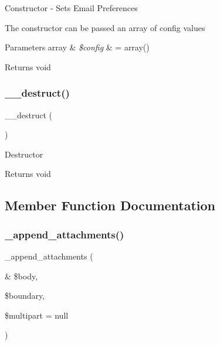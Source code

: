 Constructor -\/ Sets Email Preferences

The constructor can be passed an array of config values


\begin{DoxyParams}[1]{Parameters}
array & {\em \$config} & = array() \\
\hline
\end{DoxyParams}
\begin{DoxyReturn}{Returns}
void 
\end{DoxyReturn}
\mbox{\label{class_c_i___email_a421831a265621325e1fdd19aace0c758}} 
\subsubsection{\texorpdfstring{\+\_\+\+\_\+destruct()}{\_\_destruct()}}
{\footnotesize\ttfamily \+\_\+\+\_\+destruct (\begin{DoxyParamCaption}{ }\end{DoxyParamCaption})}

Destructor

\begin{DoxyReturn}{Returns}
void 
\end{DoxyReturn}


\subsection{Member Function Documentation}
\mbox{\label{class_c_i___email_a24b79594abe7528b9207c3dad7494f70}} 
\subsubsection{\texorpdfstring{\+\_\+append\+\_\+attachments()}{\_append\_attachments()}}
{\footnotesize\ttfamily \+\_\+append\+\_\+attachments (\begin{DoxyParamCaption}\item[{\&}]{\$body,  }\item[{}]{\$boundary,  }\item[{}]{\$multipart = {\ttfamily null} }\end{DoxyParamCaption})\hspace{0.3cm}{\ttfamily [protected]}}

